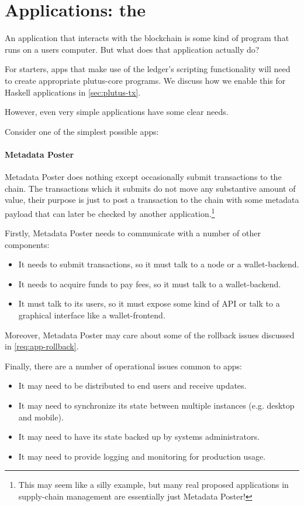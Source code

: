 \section{Applications: the }
\label{sec:paf}

An application that interacts with the blockchain is some kind of program that runs on a users computer.
But what does that application actually do?

For starters, \glspl{app} that make use of the ledger's scripting functionality will need to create appropriate \gls{plutus-core} programs.
We discuss how we enable this for Haskell applications in \cref{sec:plutus-tx}.

However, even very simple applications have some clear needs.

Consider one of the simplest possible \glspl{app}:

\paragraph{Metadata Poster}
Metadata Poster does nothing except occasionally submit transactions to the chain.
The transactions which it submits do not move any substantive amount of value, their purpose is just to post a transaction to the chain with some metadata payload that can later be checked by another application.\footnote{
This may seem like a silly example, but many real proposed applications in supply-chain management are essentially just Metadata Poster!
}
\medskip

Firstly, Metadata Poster needs to communicate with a number of other components:
\begin{itemize}
\item It needs to submit transactions, so it must talk to a \gls{node} or a \gls{wallet-backend}.
\item It needs to acquire funds to pay fees, so it must talk to a \gls{wallet-backend}.
\item It must talk to its users, so it must expose some kind of API or talk to a graphical interface like a \gls{wallet-frontend}.
\end{itemize}

Moreover, Metadata Poster may care about some of the rollback issues discussed in \cref{req:app-rollback}.

Finally, there are a number of operational issues common to \glspl{app}:
\begin{itemize}
\item It may need to be distributed to end users and receive updates.
\item It may need to synchronize its state between multiple instances (e.g. desktop and mobile).
\item It may need to have its state backed up by systems administrators.
\item It may need to provide logging and monitoring for production usage.
\end{itemize}

